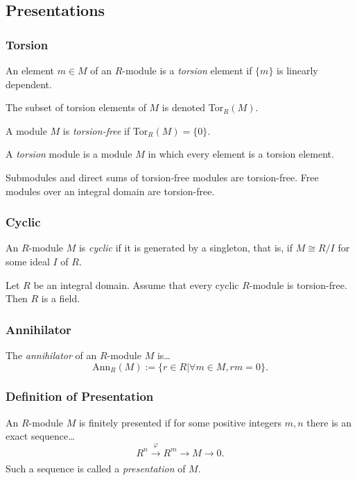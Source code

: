 \subsection{Presentations}

\subsubsection{Torsion}\label{torsion}
An element $m \in M$ of an $R$-module is a \emph{torsion} element if $\{ m \}$ is linearly dependent.\newline

\noindent The subset of torsion elements of $M$ is denoted Tor$_R(M)$. \newline

\noindent A module $M$ is \emph{torsion-free} if Tor$_R(M) = \{ 0 \}$. \newline

\noindent A \emph{torsion} module is a module $M$ in which every element is a torsion element.

\begin{lemma}
Submodules and direct sums of torsion-free modules are torsion-free. Free modules over an integral domain are torsion-free.
\end{lemma}

\subsubsection{Cyclic}\label{cyclicmodule}
An $R$-module $M$ is \emph{cyclic} if it is generated by a singleton, that is, if $M \cong R/I$ for some ideal $I$ of $R$.

\begin{lemma}
Let $R$ be an integral domain. Assume that every cyclic $R$-module is torsion-free. Then $R$ is a field.
\end{lemma}

\subsubsection{Annihilator}\label{annihilator}
The \emph{annihilator} of an $R$-module $M$ is\dots
$$\textrm{Ann}_R(M) := \{ r \in R | \forall m \in M, rm = 0 \}.$$

\subsubsection{Definition of Presentation}\label{presentation}
An $R$-module $M$ is finitely presented if for some positive integers $m,n$ there is an exact sequence\dots
$$R^n \xrightarrow[]{\varphi} R^m \longrightarrow M \longrightarrow 0.$$
Such a sequence is called a \emph{presentation} of $M$.

